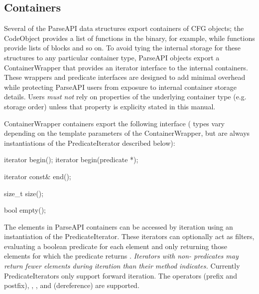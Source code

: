 
\subsection{Containers}
\label{sec:containers}

Several of the ParseAPI data structures export containers of CFG objects; the
CodeObject provides a list of functions in the binary, for example, while
functions provide lists of blocks and so on. To avoid tying the internal
storage for these structures to any particular container type, ParseAPI objects
export a ContainerWrapper that provides an iterator interface to the internal
containers. These wrappers and predicate interfaces are designed to add minimal
overhead while protecting ParseAPI users from exposure to internal container
storage details. Users \emph{must not} rely on properties of the underlying
container type (e.g. storage order) unless that property is explicity stated in
this manual.

\noindent
ContainerWrapper containers export the following interface ( types vary depending on the template parameters of the ContainerWrapper, but are always instantiations of the PredicateIterator described below):

\begin{apient}
iterator begin();
iterator begin(predicate *);
\end{apient}

\begin{apient}
iterator const& end();
\end{apient}

\begin{apient}
size_t size();
\end{apient}

\begin{apient}
bool empty();
\end{apient}

\noindent
The elements in ParseAPI containers can be accessed by iteration using an instantiation of the PredicateIterator. These iterators can optionally act as filters, evaluating a boolean predicate for each element and only returning those elements for which the predicate returns . \emph{Iterators with non- predicates may return fewer elements during iteration than their  method indicates.} Currently PredicateIterators only support forward iteration. The operators \code{++} (prefix and postfix), \code{==}, \code{!=}, and \code{*} (dereference) are supported.
